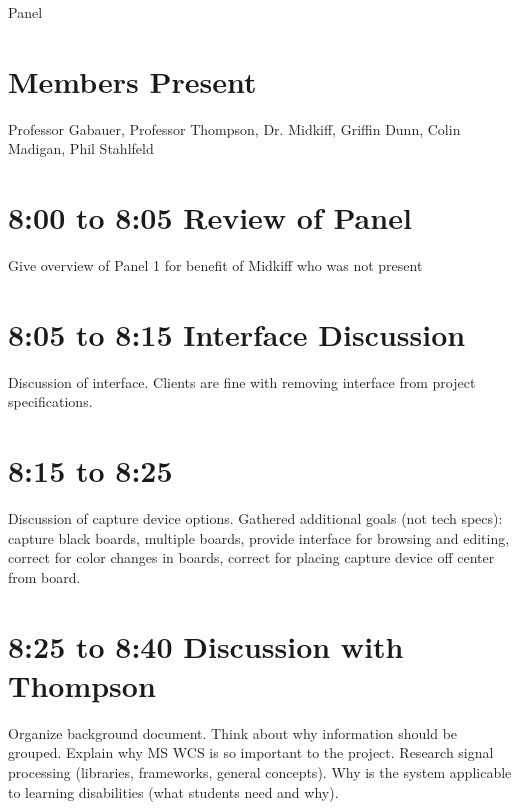 Panel\documentclass{article}
\begin{document}
    \thispagestyle{fancy}
	
	\section*{Members Present}
		Professor Gabauer, Professor Thompson, Dr. Midkiff, Griffin Dunn, Colin Madigan, Phil Stahlfeld
		
	\section*{8:00 to 8:05 Review of Panel}
		Give overview of Panel 1 for benefit of Midkiff who was not present
		
	\section*{8:05 to 8:15 Interface Discussion}
		Discussion of interface. Clients are fine with removing interface from project specifications.
		
	\section*{8:15 to 8:25}
		Discussion of capture device options. Gathered additional goals (not tech specs): capture black boards, multiple boards, provide interface for browsing and editing, correct for color changes in boards, correct for placing capture device off center from board.
		
	\section*{8:25 to 8:40 Discussion with Thompson}
		Organize background document. Think about why information should be grouped. Explain why MS WCS is so important to the project. Research signal processing (libraries, frameworks, general concepts). Why is the system applicable to learning disabilities (what students need and why). 
		
	
		
\end{document}
